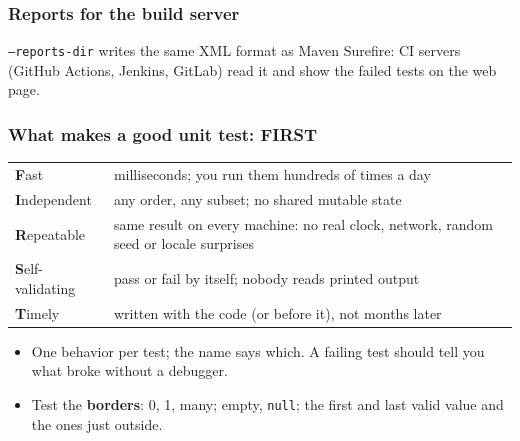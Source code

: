 \documentclass[aspectratio=169,10pt,compress]{beamer}
\begin{document}
\begin{frame}[t,fragile] \frametitle{Reports for the build server}

  \vspace{0.1em}
  \small
  \texttt{--reports-dir} writes the same XML format as Maven Surefire: CI servers (GitHub Actions, Jenkins, GitLab) read it and show
  the failed tests on the web page.
\end{frame}





\begin{frame}[t,fragile] \frametitle{What makes a good unit test: FIRST}
  \begin{center}\small
  \begin{tabular}{lL{0.68\textwidth}}
    \toprule
    \textbf{F}ast           & milliseconds; you run them hundreds of times a day \\
    \textbf{I}ndependent    & any order, any subset; no shared mutable state \\
    \textbf{R}epeatable     & same result on every machine: no real clock, network, random seed or locale surprises \\
    \textbf{S}elf-validating & pass or fail by itself; nobody reads printed output \\
    \textbf{T}imely         & written with the code (or before it), not months later \\
    \bottomrule
  \end{tabular}
  \end{center}
  \begin{itemize}\small
    \item One behavior per test; the name says which. A failing test should tell you what broke without a debugger.
    \item Test the \textbf{borders}: 0, 1, many; empty, \texttt{null}; the first and last valid value and the ones just outside.
  \end{itemize}
\end{frame}

\end{document}
